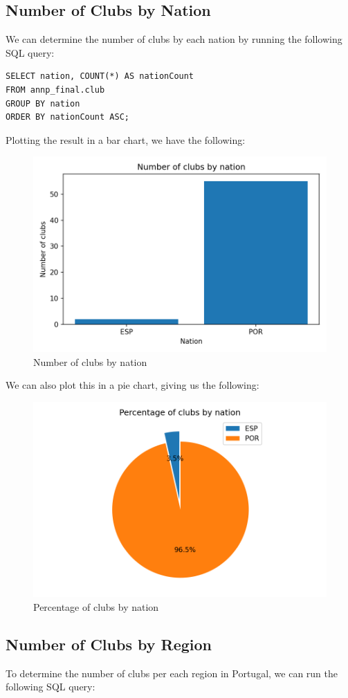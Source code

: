 \subsection{Number of Clubs by Nation}\label{subsec:number-of-clubs-by-nation}

We can determine the number of clubs by each nation by running the following SQL query:

\begin{verbatim}
SELECT nation, COUNT(*) AS nationCount
FROM annp_final.club
GROUP BY nation
ORDER BY nationCount ASC;
\end{verbatim}

Plotting the result in a bar chart, we have the following:

\begin{figure}[H]
    \centering
    \includegraphics[width=.35\textwidth]{img/clubsbynation}
    \caption{Number of clubs by nation}
    \label{fig:clubs-by-nation}
\end{figure}

We can also plot this in a pie chart, giving us the following:

\begin{figure}[H]
    \centering
    \includegraphics[width=.45\textwidth]{img/clubsbynation-pie}
    \caption{Percentage of clubs by nation}
    \label{fig:clubs-by-nation-pie}
\end{figure}

\subsection{Number of Clubs by Region}\label{subsec:number-of-clubs-by-region}

To determine the number of clubs per each region in Portugal, we can run the following SQL query:

